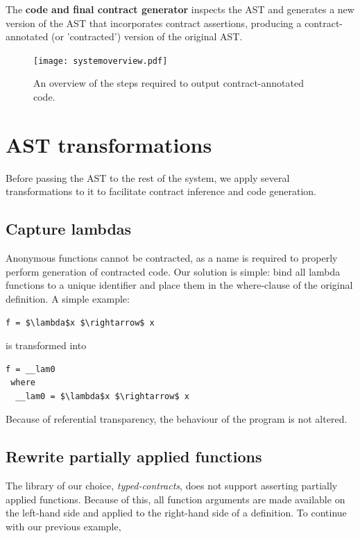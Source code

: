 \documentclass[10pt]{report}
\begin{document}
The \textbf{code and final contract generator} inspects the AST and generates a new version of the AST that incorporates contract assertions, producing a contract-annotated (or 'contracted') version of the original AST.

\begin{figure}[htbp]
\centering
\texttt{[image: systemoverview.pdf]}
\caption{An overview of the steps required to output contract-annotated code.}
\end{figure}

\section{AST transformations}
Before passing the AST to the rest of the system, we apply several transformations to it to facilitate contract inference and code generation.

\subsection{Capture lambdas}
Anonymous functions cannot be contracted, as a name is required to properly  perform generation of contracted code.
Our solution is simple: bind all lambda functions to a unique identifier and place them in the where-clause of the original definition.
A simple example:

\begin{lstlisting}[mathescape]
f = $\lambda$x $\rightarrow$ x
\end{lstlisting}

is transformed into

\begin{lstlisting}[mathescape,caption=Result of lambda capture transformation.]
f = __lam0                   
 where                    
  __lam0 = $\lambda$x $\rightarrow$ x
\end{lstlisting}

Because of referential transparency, the behaviour of the program is not altered.

\subsection{Rewrite partially applied functions}
The library of our choice, \textit{typed-contracts}, does not support asserting partially applied functions.
Because of this, all function arguments are made available on the left-hand side and applied to the right-hand side of a definition.
To continue with our previous example,
\end{document}
